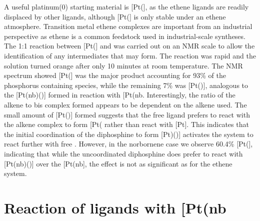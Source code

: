 A useful platinum(0) starting material is [Pt(], as the ethene ligands are readily displaced by other ligands, although [Pt(] is only stable under an ethene atmosphere.\cite{Harrison1978, Howard1983} Transition metal ethene complexes are important from an industrial perspective as ethene is a common feedstock used in industrial-scale syntheses.\cite{Yoneda2001, Degnan2001}  The 1:1 reaction between [Pt(] and \Phthixantphos{} was carried out on an NMR scale to allow the identification of any intermediates that may form.  The reaction was rapid and the solution turned orange after only 10 minutes at room temperature.  The \phosphorus{} NMR spectrum showed [Pt(\Phthixantphos{}] was the major product accounting for 93\% of the phosphorus containing species, while the remaining 7\% was [Pt(\Phthixantphos)], analogous to the [Pt(nb)(\Phthixantphos)] formed in reaction with [Pt(nb\ce{)3]}.  Interestingly, the ratio of the alkene to bis complex formed appears to be dependent on the alkene used.  The small amount of [Pt(\Phthixantphos)] formed suggests that the free ligand prefers to react with the alkene complex to form [Pt(\Phthixantphos\ce{)2]} rather than react with [Pt].  This indicates that the initial coordination of the diphosphine to form [Pt)(\Phthixantphos)] activates the system to react further with free \Phthixantphos.  However, in the norbornene case we observe 60.4\% [Pt(\Phthixantphos{}], indicating that while the uncoordinated diphosphine does prefer to react with [Pt(nb)(\Phthixantphos)] over the [Pt(nb], the effect is not as significant as for the ethene system.  

%

\section{Reaction of \tBuxantphos{} ligands with \texorpdfstring{[Pt(nb\ce{)3]}} P}  

